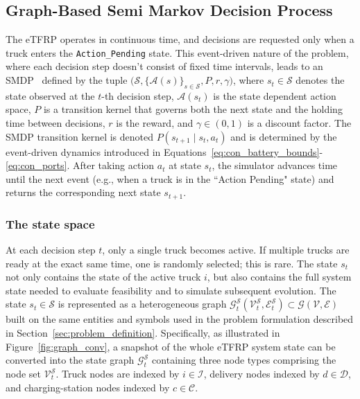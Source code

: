 \documentclass[a4paper,fleqn]{cas-sc}
\begin{document}
\subsection{Graph-Based Semi Markov Decision Process}\label{sec:smdp}
The eTFRP operates in continuous time, and decisions are requested only when a truck enters the \texttt{Action\_Pending} state. 
This event-driven nature of the problem, where each decision step doesn't consist of fixed time intervals, leads to an SMDP~\cite{Elsevier2013_ISBN9780124077959} defined by the tuple
$\big(\mathcal{S},\{\mathcal{A}(s)\}_{s\in\mathcal{S}},P,r,\gamma\big)$,
where $s_t\in\mathcal{S}$ denotes the state observed at the $t$-th decision step, $\mathcal{A}(s_t)$ is the state dependent action space, $P$ is a transition kernel that governs both the next state and the holding time between decisions, $r$ is the reward, and $\gamma\in(0,1)$ is a discount factor. 
The SMDP transition kernel is denoted $P(s_{t+1} \mid s_t, a_t)$ and is determined by the event-driven dynamics introduced in Equations~\eqref{eq:con_battery_bounds}-\eqref{eq:con_ports}. After taking action $a_t$ at state $s_t$, the simulator advances time until the next event (e.g., when a truck is in the ``Action Pending" state) and returns the corresponding next state $s_{t+1}$. 

\subsubsection{The state space}

At each decision step $t$, only a single truck becomes active. If multiple trucks are ready at the exact same time, one is randomly selected; this is rare. 
The state $s_t$ not only contains the state of the active truck $i$, but also contains the full system state needed to evaluate feasibility and to simulate subsequent evolution. The state $s_t\in \mathcal{S}$ is represented as a heterogeneous graph $\mathcal{G}^{\mathcal{S}}_t(\mathcal{V}^{\mathcal{S}}_t,\mathcal{E}^{\mathcal{S}}_t) \subset \mathcal{G}(\mathcal{V},\mathcal{E})$ built on the same entities and symbols used in the problem formulation described in Section~\ref{sec:problem_definition}.
Specifically, as illustrated in Figure~\ref{fig:graph_conv}, a snapshot of the whole eTFRP system state can be converted into the state graph $\mathcal{G}^{\mathcal{S}}_t$ containing three node types comprising the node set $\mathcal{V}^{\mathcal{S}}_t$. Truck nodes are indexed by $i\in\mathcal{I}$, delivery nodes indexed by $d\in\mathcal{D}$, and charging-station nodes indexed by $c\in\mathcal{C}$.
\end{document}
